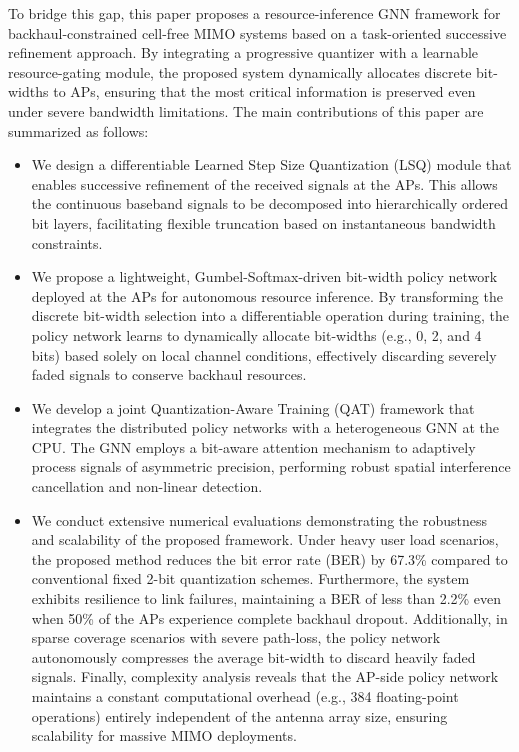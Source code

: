 To bridge this gap, this paper proposes a resource-inference GNN framework for backhaul-constrained cell-free MIMO systems based on a task-oriented successive refinement approach. By integrating a progressive quantizer with a learnable resource-gating module, the proposed system dynamically allocates discrete bit-widths to APs, ensuring that the most critical information is preserved even under severe bandwidth limitations. The main contributions of this paper are summarized as follows:
\begin{itemize}
    \item We design a differentiable Learned Step Size Quantization (LSQ) module that enables successive refinement of the received signals at the APs. This allows the continuous baseband signals to be decomposed into hierarchically ordered bit layers, facilitating flexible truncation based on instantaneous bandwidth constraints.
    \item We propose a lightweight, Gumbel-Softmax-driven bit-width policy network deployed at the APs for autonomous resource inference. By transforming the discrete bit-width selection into a differentiable operation during training, the policy network learns to dynamically allocate bit-widths (e.g., 0, 2, and 4 bits) based solely on local channel conditions, effectively discarding severely faded signals to conserve backhaul resources.
    \item We develop a joint Quantization-Aware Training (QAT) framework that integrates the distributed policy networks with a heterogeneous GNN at the CPU. The GNN employs a bit-aware attention mechanism to adaptively process signals of asymmetric precision, performing robust spatial interference cancellation and non-linear detection.
    \item We conduct extensive numerical evaluations demonstrating the robustness and scalability of the proposed framework. Under heavy user load scenarios, the proposed method reduces the bit error rate (BER) by 67.3\% compared to conventional fixed 2-bit quantization schemes. Furthermore, the system exhibits resilience to link failures, maintaining a BER of less than 2.2\% even when 50\% of the APs experience complete backhaul dropout. Additionally, in sparse coverage scenarios with severe path-loss, the policy network autonomously compresses the average bit-width to discard heavily faded signals. Finally, complexity analysis reveals that the AP-side policy network maintains a constant computational overhead (e.g., 384 floating-point operations) entirely independent of the antenna array size, ensuring scalability for massive MIMO deployments.
\end{itemize}

